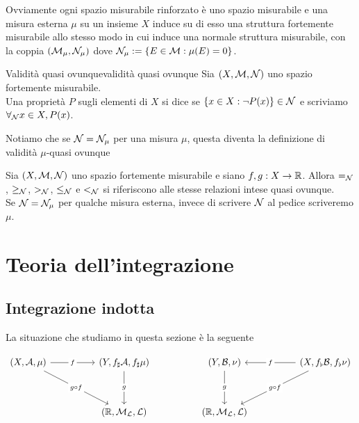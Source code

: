 \documentclass{article}
\renewcommand\A{\mc{A}}
\renewcommand\N{\mc{N}}
\begin{document}
Ovviamente ogni spazio misurabile rinforzato è uno spazio misurabile e una misura esterna $\mu$ su un insieme $X$ induce su di esso una struttura fortemente misurabile allo stesso modo in cui induce una normale struttura misurabile, con la coppia $(\M_\mu, \N_\mu)$ dove $\N_\mu := \{E \in \M : \mu(E) = 0\}$.

\begin{definition}{Validità quasi ovunque}{validità quasi ovunque}
    Sia $(X,\M,\N)$ uno spazio fortemente misurabile.\\
    Una proprietà $P$ sugli elementi di $X$ si dice  se $\{x \in X : \neg P(x)\}\in \N$ e scriviamo $\forall_\N x \in X, P(x)$.
\end{definition}

Notiamo che se $\N = \N_\mu$ per una misura $\mu$, questa diventa la definizione di validità $\mu$-quasi ovunque

\begin{notation}{}{}
    Sia $(X,\M,\N)$ uno spazio fortemente misurabile e siano $f, g : X \to \mathbb{R}$. Allora $=_\N$, $\ge_\N$, $>_\N$, $\le_\N$ e $<_\N$ si riferiscono alle stesse relazioni intese quasi ovunque.\\
    Se $\N = \N_\mu$ per qualche misura esterna, invece di scrivere $\N$ al pedice scriveremo $\mu$.
\end{notation}

\pagebreak
\section{Teoria dell'integrazione}

\subsection{Integrazione indotta}

La situazione che studiamo in questa sezione è la seguente

\[\begin{tikzcd}
	{(X,\A,\mu)} && {(Y, f_\sharp\A, f_\sharp\mu)} && {(Y, \B, \nu)} && {(X, f_\flat\B, f_\flat\nu)} \\
	\\
	&& {(\R, \M_\L, \L)} && {(\R,\M_\L, \L)}
	\arrow["f"{description}, from=1-1, to=1-3]
	\arrow["{g \circ f}"{description}, from=1-1, to=3-3]
	\arrow["g"{description}, from=1-3, to=3-3]
	\arrow["g"{description}, from=1-5, to=3-5]
	\arrow["f"{description}, from=1-7, to=1-5]
	\arrow["{g \circ f}"{description}, from=1-7, to=3-5]
\end{tikzcd}\]
\end{document}
